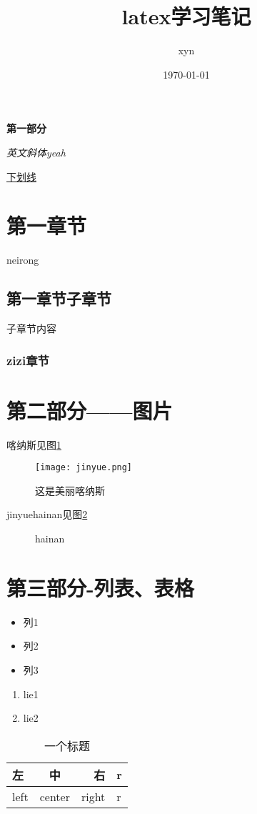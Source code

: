 \documentclass[UTF8]{ctexart}    %
\title{latex学习笔记}
\author{xyn}
\date{\today}
\begin{document}
   \maketitle        %

   \textbf{第一部分}   %

   \newpage
\thispagestyle{empty}
\tableofcontents
\newpage

   \textit{英文斜体yeah}   %

   \underline{下划线}      %

   \section{第一章节}
   neirong
   \subsection{第一章节子章节}
   子章节内容
   \subsubsection{zizi章节}

   \section{第二部分——图片}

   喀纳斯见图\ref{kanasi}
\begin{figure}[!hb]
   \centering  %
   \texttt{[image: jinyue.png]}
   \caption{这是美丽喀纳斯} \label{kanasi}
\end{figure}


   jinyuehainan见图\ref{hainan}

\begin{figure}[h]               %
   \centering
    \hfill
    \centering
   \caption{hainan}\label{hainan}
\end{figure}



\section{第三部分-列表、表格}
\begin{itemize}    %
    \item 列1
    \item 列2
    \item 列3
\end{itemize}

\begin{enumerate}    %
    \item lie1
    \item lie2
\end{enumerate}

\begin{table}
\begin{tabular}{|l|c|r|p{2cm}|}       %
\hline                          %
左&中&右&r\\
\hline
left&center&right&r\\
\hline
\end{tabular}
\caption{一个标题}
\end{table}
\end{document}
